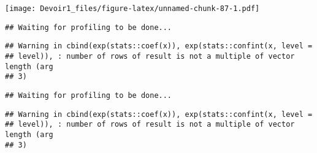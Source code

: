 \documentclass[]{article}
\newenvironment{Shaded}{\begin{snugshade}}{\end{snugshade}}
\newcommand{\KeywordTok}[1]{\textcolor[rgb]{0.13,0.29,0.53}{\textbf{#1}}}
\newcommand{\DataTypeTok}[1]{\textcolor[rgb]{0.13,0.29,0.53}{#1}}
\newcommand{\DecValTok}[1]{\textcolor[rgb]{0.00,0.00,0.81}{#1}}
\newcommand{\StringTok}[1]{\textcolor[rgb]{0.31,0.60,0.02}{#1}}
\newcommand{\OperatorTok}[1]{\textcolor[rgb]{0.81,0.36,0.00}{\textbf{#1}}}
\newcommand{\NormalTok}[1]{#1}
\begin{document}
\texttt{[image: Devoir1\_files/figure-latex/unnamed-chunk-87-1.pdf]}

\begin{Shaded}
\end{Shaded}

\begin{verbatim}
## Waiting for profiling to be done...
\end{verbatim}

\begin{verbatim}
## Warning in cbind(exp(stats::coef(x)), exp(stats::confint(x, level =
## level)), : number of rows of result is not a multiple of vector length (arg
## 3)
\end{verbatim}

\begin{verbatim}
## Waiting for profiling to be done...
\end{verbatim}

\begin{verbatim}
## Warning in cbind(exp(stats::coef(x)), exp(stats::confint(x, level =
## level)), : number of rows of result is not a multiple of vector length (arg
## 3)
\end{verbatim}
\end{document}

